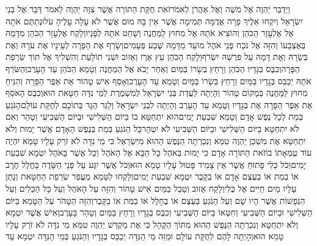 \documentclass[../main/main.tex]{subfiles}
\begin{document}
\begin{multicols}{\ncols}
וַיְדַבֵּר יַהְוֶה אֶל מֹשֶׁה וְאֶל אַהֲרֹן לֵאמֹר\PreVerseSpace{}זֹאת חֻקַּת הַתּוֹרָה אֲשֶׁר צִוָּה יַהְוֶה לֵאמֹר דַּבֵּר אֶל בְּנֵי יִשְׂרָאֵל וְיִקְחוּ אֵלֶיךָ פָרָה אֲדֻמָּה תְּמִימָה אֲשֶׁר אֵין בָּהּ מוּם אֲשֶׁר לֹא עָלָה עָלֶיהָ עֹל\PreVerseSpace{}וּנְתַתֶּם אֹתָהּ אֶל אֶלְעָזָר הַכֹּהֵן וְהוֹצִיא אֹתָהּ אֶל מִחוּץ לַמַּחֲנֶה וְשָׁחַט אֹתָהּ לְפָנָיו\PreVerseSpace{}וְלָקַח אֶלְעָזָר הַכֹּהֵן מִדָּמָהּ בְּאֶצְבָּעוֹ וְהִזָּה אֶל נֹכַח פְּנֵי אֹהֶל מוֹעֵד מִדָּמָהּ שֶׁבַע פְּעָמִים\PreVerseSpace{}וְשָׂרַף אֶת הַפָּרָה לְעֵינָיו אֶת עֹרָהּ וְאֶת בְּשָׂרָהּ וְאֶת דָּמָהּ עַל פִּרְשָׁהּ יִשְׂרֹף\PreVerseSpace{}וְלָקַח הַכֹּהֵן עֵץ אֶרֶז וְאֵזוֹב וּשְׁנִי תוֹלָעַת וְהִשְׁלִיךְ אֶל תּוֹךְ שְׂרֵפַת הַפָּרָה\PreVerseSpace{}וְכִבֶּס בְּגָדָיו הַכֹּהֵן וְרָחַץ בְּשָׂרוֹ בַּמַּיִם וְאַחַר יָבֹא אֶל הַמַּחֲנֶה וְטָמֵא הַכֹּהֵן עַד הָעָרֶב\PreVerseSpace{}וְהַשֹּׂרֵף אֹתָהּ יְכַבֵּס בְּגָדָיו בַּמַּיִם וְרָחַץ בְּשָׂרוֹ בַּמָּיִם וְטָמֵא עַד הָעָרֶב\PreVerseSpace{}וְאָסַף אִישׁ טָהוֹר אֵת אֵפֶר הַפָּרָה וְהִנִּיחַ מִחוּץ לַמַּחֲנֶה בְּמָקוֹם טָהוֹר וְהָיְתָה לַעֲדַת בְּנֵי יִשְׂרָאֵל לְמִשְׁמֶרֶת לְמֵי נִדָּה חַטָּאת הוּא\PreVerseSpace{}וְכִבֶּס הָאֹסֵף אֶת אֵפֶר הַפָּרָה אֶת בְּגָדָיו וְטָמֵא עַד הָעָרֶב וְהָיְתָה לִבְנֵי יִשְׂרָאֵל וְלַגֵּר הַגָּר בְּתוֹכָם לְחֻקַּת עוֹלָם\PreVerseSpace{}הַנֹּגֵעַ בְּמֵת לְכָל נֶפֶשׁ אָדָם וְטָמֵא שִׁבְעַת יָמִים\PreVerseSpace{}הוּא יִתְחַטָּא בוֹ בַּיּוֹם הַשְּׁלִישִׁי וּבַיּוֹם הַשְּׁבִיעִי וְטָהֵר\SubEnd{} וְאִם לֹא יִתְחַטָּא בַּיּוֹם הַשְּׁלִישִׁי וּבַיּוֹם הַשְּׁבִיעִי לֹא יִטְהָר\PreVerseSpace{}כָּל הַנֹּגֵעַ בְּמֵת בְּנֶפֶשׁ הָאָדָם אֲשֶׁר יָמוּת וְלֹא יִתְחַטָּא אֶת מִשְׁכַּן יַהְוֶה טִמֵּא וְנִכְרְתָה הַנֶּפֶשׁ הַהוּא מִיִּשְׂרָאֵל כִּי מֵי נִדָּה לֹא זֹרַק עָלָיו טָמֵא יִהְיֶה עוֹד טֻמְאָתוֹ בוֹ\PreVerseSpace{}זֹאת הַתּוֹרָה אָדָם כִּי יָמוּת בְּאֹהֶל כָּל הַבָּא אֶל הָאֹהֶל וְכָל אֲשֶׁר בָּאֹהֶל יִטְמָא שִׁבְעַת יָמִים\PreVerseSpace{}וְכֹל כְּלִי פָתוּחַ אֲשֶׁר אֵין צָמִיד פָּטוּל\SubEnd{} עָלָיו טָמֵא הוּא\PreVerseSpace{}וְכֹל אֲשֶׁר יִגַּע עַל פְּנֵי הַשָּׂדֶה בַּחֲלַל חֶרֶב אוֹ בְמֵת אוֹ בְעֶצֶם אָדָם אוֹ בְקָבֶר יִטְמָא שִׁבְעַת יָמִים\PreVerseSpace{}וְלָקְחוּ לַטָּמֵא מֵעֲפַר שְׂרֵפַת הַחַטָּאת וְנָתַן עָלָיו מַיִם חַיִּים אֶל כֶּלִי\PreVerseSpace{}וְלָקַח אֵזוֹב וְטָבַל בַּמַּיִם אִישׁ טָהוֹר וְהִזָּה עַל הָאֹהֶל וְעַל כָּל הַכֵּלִים וְעַל הַנְּפָשׁוֹת אֲשֶׁר הָיוּ שָׁם וְעַל הַנֹּגֵעַ בַּעֶצֶם אוֹ בֶחָלָל אוֹ בַמֵּת אוֹ בַקָּבֶר\PreVerseSpace{}וְהִזָּה הַטָּהֹר עַל הַטָּמֵא בַּיּוֹם הַשְּׁלִישִׁי וּבַיּוֹם הַשְּׁבִיעִי וְחִטְּאוֹ בַּיּוֹם הַשְּׁבִיעִי וְכִבֶּס בְּגָדָיו וְרָחַץ בַּמַּיִם וְטָהֵר בָּעָרֶב\PreVerseSpace{}וְאִישׁ אֲשֶׁר יִטְמָא וְלֹא יִתְחַטָּא וְנִכְרְתָה הַנֶּפֶשׁ הַהוּא מִתּוֹךְ הַקָּהָל כִּי אֶת מִקְדַּשׁ יַהְוֶה טִמֵּא מֵי נִדָּה לֹא זֹרַק עָלָיו טָמֵא הוּא\PreVerseSpace{}וְהָיְתָה לָהֶם לְחֻקַּת עוֹלָם וּמַזֵּה מֵי הַנִּדָּה יְכַבֵּס בְּגָדָיו וְהַנֹּגֵעַ בְּמֵי הַנִּדָּה יִטְמָא עַד 
\end{multicols}
\end{document}
